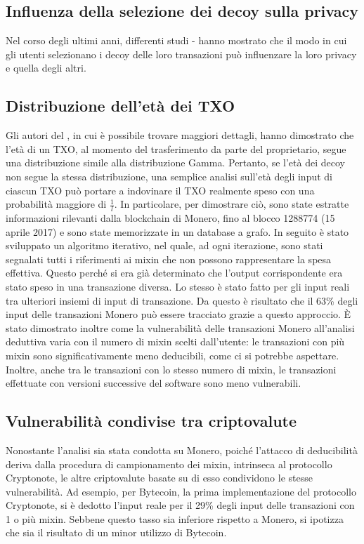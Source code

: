 \subsection{Influenza della selezione dei decoy sulla privacy}
Nel corso degli ultimi anni, differenti studi \cite{art:4}-\cite{art:5} hanno mostrato che il modo in cui gli utenti selezionano i decoy delle loro transazioni può influenzare la loro privacy e quella degli altri.

\subsection{Distribuzione dell'età dei TXO}
Gli autori del \cite{art:4}, in cui è possibile trovare maggiori dettagli, hanno dimostrato che l'età di un TXO, al momento del trasferimento da parte del proprietario, segue una distribuzione simile alla distribuzione Gamma. Pertanto, se l'età dei decoy non segue la stessa distribuzione, una semplice analisi sull'età degli input di ciascun TXO può portare a indovinare il TXO realmente speso con una probabilità maggiore di $\frac{1}{l}$. In particolare, per dimostrare ciò, sono state estratte informazioni rilevanti dalla blockchain di Monero, fino al blocco 1288774 (15 aprile 2017) e sono state memorizzate in un database a grafo. In seguito è stato sviluppato un algoritmo iterativo, nel quale, ad ogni iterazione, sono stati segnalati tutti i riferimenti ai mixin che non possono rappresentare la spesa effettiva. Questo perché si era già determinato che l'output corrispondente era stato speso in una transazione diversa. Lo stesso è stato fatto per gli input reali tra ulteriori insiemi di input di transazione. Da questo è risultato che il 63\% degli input delle transazioni Monero può essere tracciato grazie a questo approccio. È stato dimostrato inoltre come la vulnerabilità delle transazioni Monero all'analisi deduttiva varia con il numero di mixin scelti dall'utente: le transazioni con più mixin sono significativamente meno deducibili, come ci si potrebbe aspettare. Inoltre, anche tra le transazioni con lo stesso numero di mixin, le transazioni effettuate con versioni successive del software sono meno vulnerabili.

\subsection{Vulnerabilità condivise tra criptovalute}
Nonostante l'analisi sia stata condotta su Monero, poiché l'attacco di deducibilità deriva dalla procedura di campionamento dei mixin, intrinseca al protocollo Cryptonote, le altre criptovalute basate su di esso condividono le stesse vulnerabilità. Ad esempio, per Bytecoin, la prima implementazione del protocollo Cryptonote, si è dedotto l'input reale per il 29\% degli input delle transazioni con 1 o più mixin. Sebbene questo tasso sia inferiore rispetto a Monero, si ipotizza che sia il risultato di un minor utilizzo di Bytecoin.


